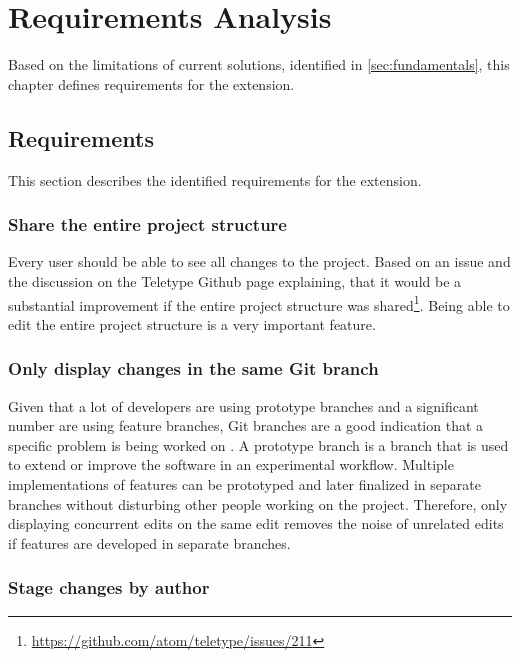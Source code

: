 \chapter{Requirements Analysis}

Based on the limitations of current solutions, identified in \autoref{sec:fundamentals}, this chapter defines requirements for the extension.

\section{Requirements}

This section describes the identified requirements for the extension.

\subsection{Share the entire project structure}

Every user should be able to see all changes to the project.
Based on an issue and the discussion on the Teletype Github page explaining, that it would be a substantial improvement if the entire project structure was shared\footnote{\href{https://github.com/atom/teletype/issues/211}{https://github.com/atom/teletype/issues/211}}. Being able to edit the entire project structure is a very important feature.

\subsection{Only display changes in the same Git branch}

Given that a lot of developers are using prototype branches and a significant number are using feature branches, Git branches are a good indication that a specific problem is being worked on \cite{PhillipsSillitoWalker:2011:Branching_and_merging}. A prototype branch is a branch that is used to extend or improve the software in an experimental workflow. Multiple implementations of features can be prototyped and later finalized in separate branches without disturbing other people working on the project. Therefore, only displaying concurrent edits on the same edit removes the noise of unrelated edits if features are developed in separate branches. 

\subsection{Stage changes by author}

